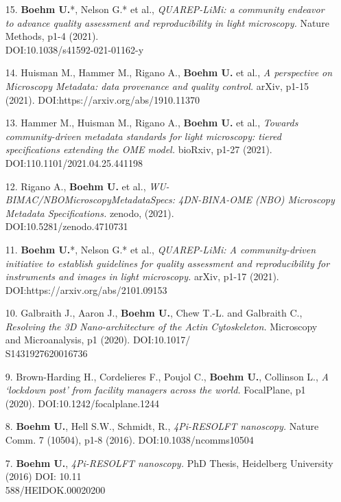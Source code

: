 \documentclass[margin,line]{res}
\begin{document}
\begin{resume}
\begin{enumerate}[leftmargin=*]
\item[15.] {\bf Boehm U.}*, Nelson G.* et al., {\it QUAREP-LiMi: a community endeavor to advance quality assessment and reproducibility in light microscopy.} Nature Methods, p1-4 (2021). \\DOI:10.1038/s41592-021-01162-y

\item[14.] Huisman M., Hammer M., Rigano A., {\bf Boehm U.} et al., {\it A perspective on Microscopy Metadata: data provenance and quality control.} arXiv, p1-15 (2021). DOI:https://arxiv.org/abs/1910.11370

\item[13.] Hammer M., Huisman M., Rigano A., {\bf Boehm U.} et al., {\it Towards community-driven metadata standards for light microscopy: tiered specifications extending the OME model.} bioRxiv, p1-27 (2021). DOI:110.1101/2021.04.25.441198

\item[12.] Rigano A., {\bf Boehm U.} et al., {\it WU-BIMAC/NBOMicroscopyMetadataSpecs: 4DN-BINA-OME (NBO) Microscopy Metadata Specifications.} zenodo, (2021). \\DOI:10.5281/zenodo.4710731

\item[11.] {\bf Boehm U.}*, Nelson G.* et al., {\it QUAREP-LiMi: A community-driven initiative to establish guidelines for quality assessment and reproducibility for instruments and images in light microscopy.} arXiv, p1-17 (2021). DOI:https://arxiv.org/abs/2101.09153

\item[10.] Galbraith J., Aaron J., {\bf Boehm U.}, Chew T.-L. and Galbraith C., {\it Resolving the 3D Nano-architecture of the Actin Cytoskeleton.} Microscopy and Microanalysis, p1 (2020). DOI:10.1017/\\S1431927620016736

\item[9.] Brown-Harding H., Cordelieres F., Poujol C., {\bf Boehm U.}, Collinson L., {\it A ‘lockdown post’ from facility managers across the world.} FocalPlane, p1 (2020). DOI:10.1242/focalplane.1244

\item[8.]  {\bf Boehm U.}, Hell S.W., Schmidt, R., {\it 4Pi-RESOLFT nanoscopy.} Nature Comm. 7 (10504), p1-8 (2016). DOI:10.1038/ncomms10504

\item[7.] {\bf Boehm U.},  {\it 4Pi-RESOLFT nanoscopy.} PhD Thesis, Heidelberg University (2016) DOI: 10.11\\588/HEIDOK.00020200


\end{enumerate}
\end{resume}
\end{document}
